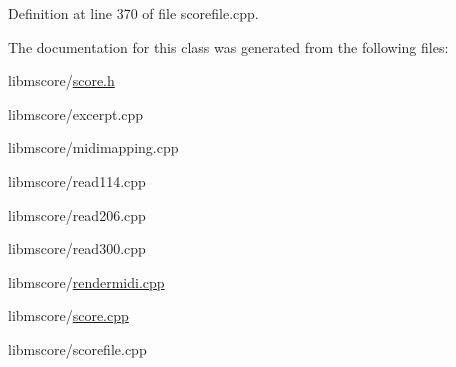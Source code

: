 Definition at line 370 of file scorefile.\+cpp.



The documentation for this class was generated from the following files\+:\begin{DoxyCompactItemize}
\item 
libmscore/\hyperlink{score_8h}{score.\+h}\item 
libmscore/excerpt.\+cpp\item 
libmscore/midimapping.\+cpp\item 
libmscore/read114.\+cpp\item 
libmscore/read206.\+cpp\item 
libmscore/read300.\+cpp\item 
libmscore/\hyperlink{rendermidi_8cpp}{rendermidi.\+cpp}\item 
libmscore/\hyperlink{score_8cpp}{score.\+cpp}\item 
libmscore/scorefile.\+cpp\end{DoxyCompactItemize}
